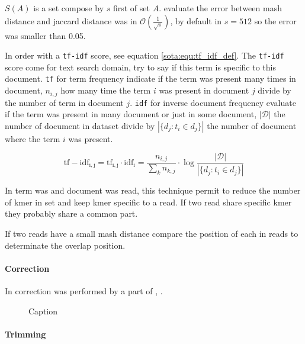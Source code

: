 \documentclass[main]{subfiles}
\begin{document}
$S(A)$ is a \kmers set compose by $s$ first \kmers of set $A$. \citeauthor{mash_distance} evaluate the error between mash distance and jaccard distance was in $\mathcal{O}(\frac{1}{\sqrt{s}})$, by default in \mhap $s=512$ so the error was smaller than 0.05.

In \mhap order \kmer with a \texttt{tf-idf} score, see equation \ref{sota:equ:tf_idf_def}. The \texttt{tf-idf} score come for text search domain, try to say if this term is specific to this document. \texttt{tf} for term frequency indicate if the term was present many times in document, $n_{i,j}$ how many time the term $i$ was present in document $j$ divide by the number of term in document $j$. \texttt{idf} for inverse document frequency evaluate if the term was present in many document or just in some document, $|\mathcal{D}|$ the number of document in dataset divide by $|\{d_{j}:t_{i}\in d_{j}\}|$ the number of document where the term $i$ was present.

\begin{equation}
\mathrm{tf-idf_{i,j}} = \mathrm{tf_{i,j}} \cdot \mathrm{idf_{i}} = \frac{n_{i,j}}{\sum_{k}n_{k,j}} \cdot \log{\frac  {|\mathcal{D}|}{|\{d_{j}:t_{i}\in d_{j}\}|}}
\label{sota:equ:tf_idf_def}
\end{equation}

In \mhap term was \kmer and document was read, this technique permit to reduce the number of kmer in set and keep kmer specific to a read. If two read share specific kmer they probably share a common part.

If two reads have a small mash distance \mhap compare the position of each \kmer in reads to determinate the overlap position.

\paragraph{Correction}

In \canu correction was performed by a part of  \cite{falcon}, . 

\begin{figure}[ht]
    \centering
    \caption{Caption}
    \label{sota:fig:canu:correction}
\end{figure}

\paragraph{Trimming}
\end{document}
